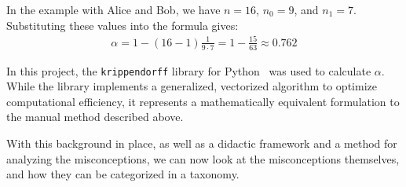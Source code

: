 In the example with Alice and Bob, we have \(n = 16\), \(n_0 = 9\), and \(n_1 = 7\). Substituting these values into the formula gives:
\begin{align}
    \alpha = 1 - (16-1)\frac{1}{9 \cdot 7} = 1 - \frac{15}{63} \approx 0.762
\end{align}

In this project, the \texttt{krippendorff} library for Python~\cite{castro-2017-fast-krippendorff} was used to calculate \(\alpha \). While the library implements a generalized, vectorized algorithm to optimize computational efficiency, it represents a mathematically equivalent formulation to the manual method described above.

With this background in place, as well as a didactic framework and a method for analyzing the misconceptions, we can now look at the misconceptions themselves, and how they can be categorized in a taxonomy.